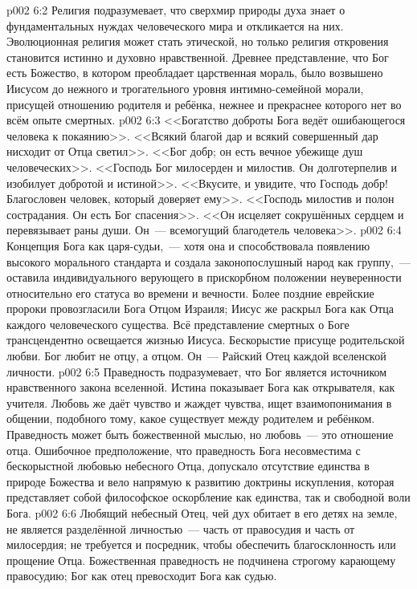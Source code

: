 \vs p002 6:2 Религия подразумевает, что сверхмир природы духа знает о фундаментальных нуждах человеческого мира и откликается на них. Эволюционная религия может стать этической, но только религия откровения становится истинно и духовно нравственной. Древнее представление, что Бог есть Божество, в котором преобладает царственная мораль, было возвышено Иисусом до нежного и трогательного уровня интимно\hyp{}семейной морали, присущей отношению родителя и ребёнка, нежнее и прекраснее которого нет во всём опыте смертных.
\vs p002 6:3 \pc <<Богатство доброты Бога ведёт ошибающегося человека к покаянию>>. <<Всякий благой дар и всякий совершенный дар нисходит от Отца светил>>. <<Бог добр; он есть вечное убежище душ человеческих>>. <<Господь Бог милосерден и милостив. Он долготерпелив и изобилует добротой и истиной>>. <<Вкусите, и увидите, что Господь добр! Благословен человек, который доверяет ему>>. <<Господь милостив и полон сострадания. Он есть Бог спасения>>. <<Он исцеляет сокрушённых сердцем и перевязывает раны души. Он~--- всемогущий благодетель человека>>.
\vs p002 6:4 \pc Концепция Бога как царя\hyp{}судьи,~--- хотя она и способствовала появлению высокого морального стандарта и создала законопослушный народ как группу,~--- оставила индивидуального верующего в прискорбном положении неуверенности относительно его статуса во времени и вечности. Более поздние еврейские пророки провозгласили Бога Отцом Израиля; Иисус же раскрыл Бога как Отца каждого человеческого существа. Всё представление смертных о Боге трансцендентно освещается жизнью Иисуса. Бескорыстие присуще родительской любви. Бог любит не  отцу, а  отцом. Он~--- Райский Отец каждой вселенской личности.
\vs p002 6:5 \pc Праведность подразумевает, что Бог является источником нравственного закона вселенной. Истина показывает Бога как открывателя, как учителя. Любовь же даёт чувство и жаждет чувства, ищет взаимопонимания в общении, подобного тому, какое существует между родителем и ребёнком. Праведность может быть божественной мыслью, но любовь~--- это отношение отца. Ошибочное предположение, что праведность Бога несовместима с бескорыстной любовью небесного Отца, допускало отсутствие единства в природе Божества и вело напрямую к развитию доктрины искупления, которая представляет собой философское оскорбление как единства, так и свободной воли Бога.
\vs p002 6:6 Любящий небесный Отец, чей дух обитает в его детях на земле, не является разделённой личностью~--- часть от правосудия и часть от милосердия; не требуется и посредник, чтобы обеспечить благосклонность или прощение Отца. Божественная праведность не подчинена строгому карающему правосудию; Бог как отец превосходит Бога как судью.
